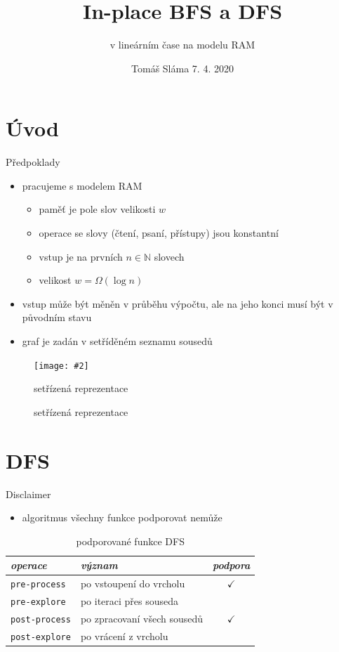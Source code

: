 \documentclass[czech]{beamer}
\title{In-place BFS a DFS}
\subtitle{v lineárním čase na modelu RAM}
\date{Tomáš Sláma \hfill 7. 4. 2020}
\makeatletter
\newcommand{\fitimage}[2][\@nil]{
	\begin{figure}
		\begin{adjustbox}{width=0.9\textwidth, totalheight=\textheight-2\baselineskip-2\baselineskip,keepaspectratio}
			\texttt{[image: \#2]}
		\end{adjustbox}
		\def\tmp{#1}%
	 \ifx\tmp\@nnil
			\else
			\caption{#1}
		\fi
	\end{figure}
}
\makeatother
\begin{document}
	\begin{frame}
		\maketitle
	\end{frame}
	
	\section{Úvod}
	\begin{frame}{Předpoklady}
		\begin{itemize}
			\item pracujeme s modelem RAM
			\begin{itemize}
				\item paměť je pole slov velikosti $w$
				\item operace se slovy (čtení, psaní, přístupy) jsou konstantní
				\item vstup je na prvních $n \in \mathbb{N}$ slovech
				\item velikost $w = \Omega\left(\log n\right)$
			\end{itemize}
			\vfill
			\item vstup může být měněn v průběhu výpočtu, ale na jeho konci musí být v původním stavu
			\vfill
			\item graf je zadán v setříděném seznamu sousedů
		\end{itemize}

		\fitimage[setřízená reprezentace]{images/sorted.png}
	\end{frame}

	\section{DFS}

	\begin{frame}{Disclaimer}
		\begin{itemize}
			\item algoritmus všechny funkce podporovat nemůže
		\end{itemize}

		\begin{table}
			\centering
			\begin{tabular}{llc}
				\toprule
				\emph{operace} & \emph{význam} & \emph{podpora} \\
				\midrule
				\texttt{pre-process} & po vstoupení do vrcholu & $\checkmark$ \\
				\texttt{pre-explore} & po iteraci přes souseda &  \\
				\texttt{post-process} & po zpracovaní všech sousedů & $\checkmark$ \\
				\texttt{post-explore} & po vrácení z vrcholu &  \\
				\bottomrule
			\end{tabular}
			\caption{podporované funkce DFS}
		\end{table}
	\end{frame}
\end{document}

